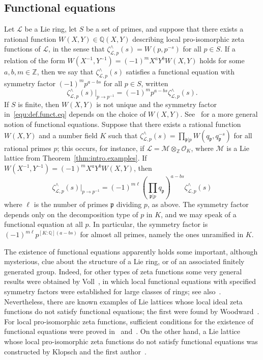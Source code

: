 \documentclass[11pt,a4paper]{amsart}
\theoremstyle{plain}
\theoremstyle{remark}
\newcommand{\Z}{\mathbb{Z}}
\newcommand{\Q}{\mathbb{Q}}
\newcommand{\tensor}{\otimes}
\newcommand{\p}{\mathfrak{p}}
\newcommand{\npr}{\ell}
\def \p {\ensuremath{\mathfrak{p}}}
\begin{document}
\subsection{Functional equations} \label{sec:intro.funct.eq}
Let $\mathcal{L}$ be a Lie ring, let $S$ be a set of primes, and suppose that there exists a rational function $W(X,Y) \in \Q(X,Y)$ describing local pro-isomorphic zeta functions of $\mathcal{L}$, in the sense that $\zeta^\wedge_{\mathcal{L},p}(s) = W(p,p^{-s})$ for all $p \in S$.  If a relation of the form $W(X^{-1},Y^{-1}) = (-1)^m X^a Y^b W(X,Y)$ holds for some $a,b,m \in \Z$, then we say that $\zeta^\wedge_{\mathcal{L},p}(s)$ satisfies a functional equation with symmetry factor $(-1)^m p^{a-bs}$ for all $p \in S$, written 
\begin{equation} \label{equ:def.funct.eq}
\zeta^\wedge_{\mathcal{L},p}(s) |_{p \to p^{-1}} = (-1)^m p^{a-bs} \zeta^\wedge_{\mathcal{L},p}(s).
\end{equation}
If $S$ is finite, then $W(X,Y)$ is not unique and the symmetry factor in~\eqref{equ:def.funct.eq} depends on the choice of $W(X,Y)$.
See~\cite{Voll/10} for a more general notion of functional equations.  Suppose that there exists a rational function $W(X,Y)$ and a number field $K$ such that $\zeta^\wedge_{\mathcal{L},p}(s) = \prod_{\p | p} W(q_\p, q_\p^{-s})$ for all rational primes $p$; this occurs, for instance, if $\mathcal{L} = \mathcal{M} \tensor_\Z \mathcal{O}_K$, where $\mathcal{M}$ is a Lie lattice from Theorem~\ref{thm:intro.examples}.  If $W(X^{-1}, Y^{-1}) = (-1)^m X^a Y^b W(X,Y)$, then
\begin{equation} \label{equ:unram.funct.eq}
 \zeta^\wedge_{\mathcal{L},p}(s) |_{p \to p^{-1}} = (-1)^{m\npr} \left( \prod_{\p | p} q_\p \right)^{a-bs} \zeta^\wedge_{\mathcal{L},p}(s)
 \end{equation}
where $\npr$ is the number of primes $\p$ dividing $p$, as above.
The symmetry factor depends only on the decomposition type of $p$ in $K$, and we may speak of a functional equation at all $p$.
In particular, the symmetry factor is $(-1)^{m\npr} p^{[K:\Q](a-bs)}$ for almost all primes, namely the ones unramified in $K$.


The existence of functional equations apparently holds some important, although mysterious, clue about the structure of a Lie ring, or of an associated finitely generated group. Indeed, for other types of zeta functions some very general results were obtained by Voll~\cite{Voll/10, Voll/17}, in which local functional equations with specified symmetry factors were established for large classes of rings; see also~\cite{LeeVoll/20}. Nevertheless, there are known examples of Lie lattices whose local ideal zeta functions do not satisfy functional equations; the first were found by Woodward~\cite[Theorems~2.32 and~2.74]{duSWoodward/08}.  For local pro-isomorphic zeta functions, sufficient conditions for the existence of functional equations were proved in~\cite[\S6]{duSLubotzky/96} and~\cite[Theorem~1.1]{Berman/11}.  On the other hand, a Lie lattice whose local pro-isomorphic zeta functions do not satisfy functional equations was constructed by Klopsch and the first author~\cite{BK/15}. 
\end{document}
